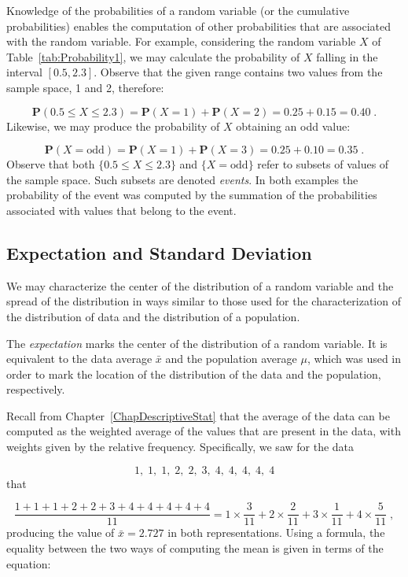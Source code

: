 \documentclass[]{krantz}
\newcommand{\Prob}{\mathbf{P}}
\theoremstyle{definition}
\theoremstyle{definition}
\theoremstyle{definition}
\theoremstyle{remark}
\begin{document}
Knowledge of the probabilities of a random variable (or the cumulative
probabilities) enables the computation of other probabilities that are
associated with the random variable. For example, considering the random
variable \(X\) of Table~\ref{tab:Probability1}, we may calculate the
probability of \(X\) falling in the interval \([0.5, 2.3]\). Observe that
the given range contains two values from the sample space, 1 and 2,
therefore:

\[\Prob(0.5 \leq X \leq 2.3) = \Prob(X=1) + \Prob(X = 2) = 0.25 + 0.15 = 0.40\;.\]
Likewise, we may produce the probability of \(X\) obtaining an odd value:

\[\Prob(X = \mbox{odd}) = \Prob(X=1) + \Prob(X=3) = 0.25 + 0.10 = 0.35\;.\]
Observe that both \(\{0.5 \leq X \leq 2.3\}\) and \(\{X = \mbox{odd}\}\)
refer to subsets of values of the sample space. Such subsets are denoted
\emph{events}. In both examples the probability of the event was computed by
the summation of the probabilities associated with values that belong to
the event.

\hypertarget{expectation-and-standard-deviation}{%
\subsection{Expectation and Standard Deviation}\label{expectation-and-standard-deviation}}

We may characterize the center of the distribution of a random variable
and the spread of the distribution in ways similar to those used for the
characterization of the distribution of data and the distribution of a
population.

The \emph{expectation} marks the center of the distribution of a random
variable. It is equivalent to the data average \(\bar x\) and the
population average \(\mu\), which was used in order to mark the location
of the distribution of the data and the population, respectively.

Recall from Chapter~\ref{ChapDescriptiveStat} that the average of the data
can be computed as the weighted average of the values that are present
in the data, with weights given by the relative frequency. Specifically,
we saw for the data

\[1,\; 1,\; 1,\; 2,\; 2,\; 3,\; 4,\; 4,\; 4,\; 4,\; 4\] that

\[\frac{1 + 1 + 1 + 2 + 2 + 3 + 4 + 4 + 4 + 4 + 4}{11} =
1\times \frac{3}{11} + 2 \times \frac{2}{11} + 3 \times \frac{1}{11} + 4 \times \frac{5}{11}\;,\]
producing the value of \(\bar x =2.727\) in both representations. Using a
formula, the equality between the two ways of computing the mean is
given in terms of the equation:
\end{document}
